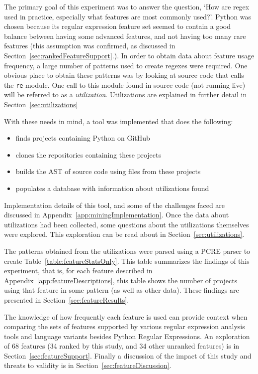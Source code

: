 
The primary goal of this experiment was to answer the question, `How are regex used in practice, especially what features are most commonly used?'.  Python was chosen because its regular expression feature set seemed to contain a good balance between having some advanced features, and not having too many rare features (this assumption was confirmed, as discussed in Section~\ref{sec:rankedFeatureSupport}.).  In order to obtain data about feature usage frequency, a large number of patterns used to create regexes were required.  One obvious place to obtain these patterns was by looking at source code that calls the {\tt re} module.  One call to this module found in source code (not running live) will be referred to as a \emph{utilization}.  Utilizations are explained in further detail in Section~\ref{sec:utilizations}

With these needs in mind, a tool was implemented that does the following:
\begin{itemize} \itemsep -1pt
\item finds projects containing Python on GitHub
\item clones the repositories containing these projects
\item builds the AST of source code using files from these projects
\item populates a database with information about utilizations found
\end{itemize}

Implementation details of this tool, and some of the challenges faced are discussed in Appendix~\ref{app:miningImplementation}.  Once the data about utilizations had been collected, some questions about the utilizations themselves were explored.  This exploration can be read about in Section~\ref{sec:utilizations}.

The patterns obtained from the utilizations were parsed using a PCRE parser to create Table~\ref{table:featureStatsOnly}.  This table summarizes the findings of this experiment, that is, for each feature described in Appendix~\ref{app:featureDescriptions}, this table shows the number of projects using that feature in some pattern (as well as other data).  These findings are presented in Section~\ref{sec:featureResults}.

The knowledge of how frequently each feature is used can provide context when comparing the sets of features supported by various regular expression analysis tools and language variants besides Python Regular Expressions.  An exploration of 68 features (34 ranked by this study, and 34 other unranked features) is in Section~\ref{sec:featureSupport}.  Finally a discussion of the impact of this study and threats to validity is in Section~\ref{sec:featureDiscussion}.
